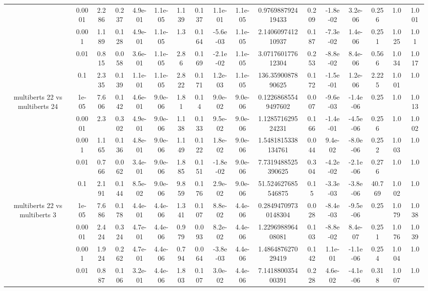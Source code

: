 \begin{tabular}{|c|c|c|c|c|c|c|c|c|c|c|c|c|c|c|c|c|}
 & 0.0001 & 2.286 & 0.237 & 4.9e-01 & 1.1e-05 & 1.139 & 0.137 & 1.1e-01 & 1.1e-05 & 0.976988792419433 & 0.209 & -1.8e-02 & 3.2e-06 & 0.256 & 1.0 & 1.001 \\
 & 0.001 & 1.189 & 0.128 & 4.9e-01 & 1.1e-05 & 1.3 & 0.164 & -5.6e-03 & 1.1e-05 & 2.140609741210937 & 0.187 & -7.3e-02 & 1.4e-06 & 0.251 & 1.025 & 1.01 \\
 & 0.01 & 0.815 & 0.058 & 3.6e-01 & 1.1e-05 & 2.86 & 0.169 & -2.1e-02 & 1.1e-05 & 3.071760177612304 & 0.253 & -8.8e-02 & 8.4e-06 & 0.566 & 1.034 & 1.017 \\
 & 0.1 & 2.335 & 0.139 & 1.1e-01 & 1.1e-05 & 2.822 & 0.171 & 1.2e-03 & 1.1e-05 & 136.3590087890625 & 0.172 & -1.5e-01 & 1.2e-06 & 2.225 & 1.001 & 1.0 \\
\hline
\multirow{5}{*}{multiberts 22 vs multiberts 24} & 1e-05 & 7.606 & 0.142 & 4.6e-01 & 9.0e-06 & 1.81 & 0.14 & 9.0e-02 & 9.0e-06 & 0.12268685549497602 & 0.007 & -9.6e-03 & -1.4e-06 & 0.25 & 1.0 & 1.013 \\
 & 0.0001 & 2.3 & 0.302 & 4.9e-01 & 9.0e-06 & 1.138 & 0.133 & 9.5e-02 & 9.0e-06 & 1.128571629524231 & 0.166 & -1.4e-01 & -4.5e-06 & 0.256 & 1.0 & 1.002 \\
 & 0.001 & 1.165 & 0.136 & 4.8e-01 & 9.0e-06 & 1.149 & 0.122 & 1.8e-02 & 9.0e-06 & 1.5481815338134761 & 0.044 & 9.4e-02 & -8.0e-06 & 0.252 & 1.003 & 1.0 \\
 & 0.01 & 0.766 & 0.062 & 3.4e-01 & 9.0e-06 & 1.885 & 0.151 & -1.8e-02 & 9.0e-06 & 7.7319488525390625 & 0.304 & -4.2e-02 & -2.1e-06 & 0.276 & 1.0 & 1.0 \\
 & 0.1 & 2.191 & 0.144 & 8.5e-02 & 9.0e-06 & 9.859 & 0.176 & 2.9e-02 & 9.0e-06 & 51.524627685546875 & 0.15 & -3.3e-03 & -3.8e-06 & 40.769 & 1.002 & 1.0 \\
\hline
\multirow{5}{*}{multiberts 22 vs multiberts 3} & 1e-05 & 7.686 & 0.178 & 4.4e-01 & 4.4e-06 & 1.341 & 0.107 & 8.8e-02 & 4.4e-06 & 0.28494709730148304 & 0.028 & -8.4e-03 & -9.5e-06 & 0.25 & 1.079 & 1.038 \\
 & 0.0001 & 2.424 & 0.324 & 4.7e-01 & 4.4e-06 & 0.979 & 0.093 & 8.2e-02 & 4.4e-06 & 1.229698896408081 & 0.103 & -8.8e-02 & 8.4e-07 & 0.251 & 1.076 & 1.039 \\
 & 0.001 & 1.924 & 0.262 & 4.7e-01 & 4.4e-06 & 0.794 & 0.064 & -3.8e-03 & 4.4e-06 & 1.486487627029419 & 0.142 & 1.1e-01 & -1.1e-06 & 0.254 & 1.004 & 1.0 \\
 & 0.01 & 0.887 & 0.106 & 3.2e-01 & 4.4e-06 & 1.803 & 0.107 & 3.0e-02 & 4.4e-06 & 7.141880035400391 & 0.228 & 4.6e-02 & -4.1e-06 & 0.318 & 1.007 & 1.0 \\

\end{tabular}
